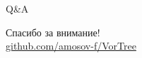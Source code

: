 \documentclass[14pt, fleqn, xcolor={dvipsnames, table}]{beamer}
\begin{document}
        \begin{frame}{Q\&A}
            \begin{center}
                Спасибо за внимание!\\
                \href{https://github.com/amosov-f/VorTree}{github.com/amosov-f/VorTree}
            \end{center}
        \end{frame}
        
\end{document}
